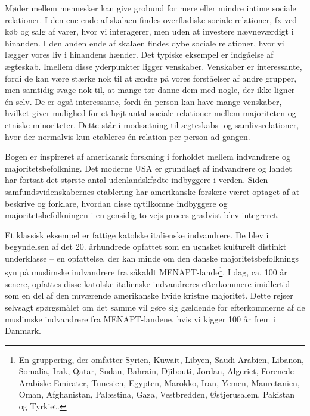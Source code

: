 \documentclass[
]{book}
\begin{document}
Møder mellem mennesker kan give grobund for mere eller mindre intime sociale relationer. I den ene ende af skalaen findes overfladiske sociale relationer, fx ved køb og salg af varer, hvor vi interagerer, men uden at investere nævneværdigt i hinanden. I den anden ende af skalaen findes dybe sociale relationer, hvor vi lægger vores liv i hinandens hænder. Det typiske eksempel er indgåelse af ægteskab. Imellem disse yderpunkter ligger venskaber. Venskaber er interessante, fordi de kan være stærke nok til at ændre på vores forståelser af andre grupper, men samtidig svage nok til, at mange tør danne dem med nogle, der ikke ligner én selv. De er også interessante, fordi én person kan have mange venskaber, hvilket giver mulighed for et højt antal sociale relationer mellem majoriteten og etniske minoriteter. Dette står i modsætning til ægteskabs- og samlivsrelationer, hvor der normalvis kun etableres én relation per person ad gangen.

Bogen er inspireret af amerikansk forskning i forholdet mellem indvandrere og majoritetsbefolkning. Det moderne USA er grundlagt af indvandrere og landet har fortsat det største antal udenlandskfødte indbyggere i verden. Siden samfundsvidenskabernes etablering har amerikanske forskere været optaget af at beskrive og forklare, hvordan disse nytilkomne indbyggere og majoritetsbefolkningen i en gensidig to-vejs-proces gradvist blev integreret.

Et klassisk eksempel er fattige katolske italienske indvandrere. De blev i begyndelsen af det 20. århundrede opfattet som en uønsket kulturelt distinkt underklasse -- en opfattelse, der kan minde om den danske majoritetsbefolknings syn på muslimske indvandrere fra såkaldt MENAPT-lande\footnote{En gruppering, der omfatter Syrien, Kuwait, Libyen, Saudi-Arabien, Libanon, Somalia, Irak, Qatar, Sudan, Bahrain, Djibouti, Jordan, Algeriet, Forenede Arabiske Emirater, Tunesien, Egypten, Marokko, Iran, Yemen, Mauretanien, Oman, Afghanistan, Palæstina, Gaza, Vestbredden, Østjerusalem, Pakistan og Tyrkiet.}. I dag, ca. 100 år senere, opfattes disse katolske italienske indvandreres efterkommere imidlertid som en del af den nuværende amerikanske hvide kristne majoritet. Dette rejser selvsagt spørgsmålet om det samme vil gøre sig gældende for efterkommerne af de muslimske indvandrere fra MENAPT-landene, hvis vi kigger 100 år frem i Danmark.
\end{document}
